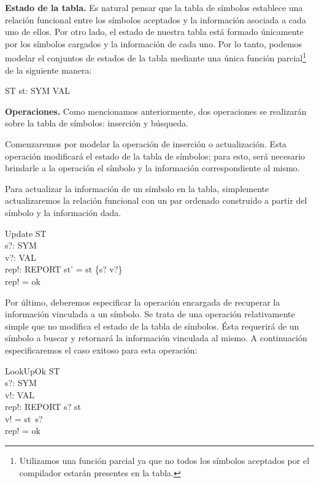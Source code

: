\bigskip
\noindent
\textbf{Estado de la tabla.} Es natural pensar que la tabla de símbolos establece una relación funcional entre los símbolos aceptados y la información asociada a cada uno de ellos. Por otro lado, el estado de nuestra tabla está formado únicamente por los símbolos cargados y la información de cada uno. Por lo tanto, podemos modelar el conjuntos de estados de la tabla mediante una única función parcial\footnote{Utilizamos una función parcial ya que no todos los símbolos aceptados por el compilador estarán presentes en la tabla.} de la siguiente manera:

\begin{schema}{ST}
st: SYM \pfun VAL
\end{schema}

\bigskip
\noindent
\textbf{Operaciones.} Como mencionamos anteriormente, dos operaciones se realizarán sobre la tabla de símbolos: inserción y búsqueda.

\bigskip
Comenzaremos por modelar la operación de inserción o actualización. Esta operación modificará el estado de la tabla de símbolos; para esto, será necesario brindarle a la operación el símbolo y la información correspondiente al mismo.

Para actualizar la información de un símbolo en la tabla, simplemente actualizaremos la relación funcional con un par ordenado construido a partir del símbolo y la información dada. 

\begin{schema}{Update}
  \Delta ST \\
  s?: SYM \\
  v?: VAL \\
  rep!: REPORT
  \where
  st' = st \oplus \{s? \mapsto v?\} \\
  rep! = ok
\end{schema}

Por último, deberemos especificar la operación encargada de recuperar la información vinculada a un símbolo. Se trata de una operación relativamente simple que no modifica el estado de la tabla de símbolos. Ésta requerirá de un símbolo a buscar y retornará la información vinculada al mismo. A continuación especificaremos el caso exitoso para esta operación:

\begin{schema}{LookUpOk}
\Xi ST \\
s?: SYM \\
v!: VAL \\
rep!: REPORT
\where
s? \in \dom st \\
v! = st~s? \\
rep! = ok
\end{schema} 

